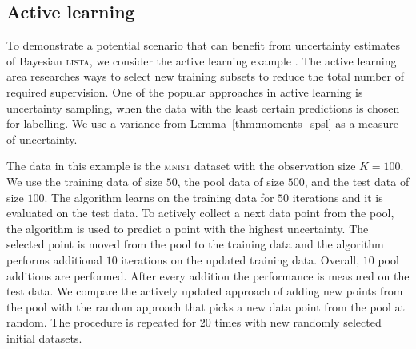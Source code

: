 \documentclass{article}
\begin{document}
\subsection{Active learning}
To demonstrate a potential scenario that can benefit from uncertainty estimates of Bayesian \textsc{lista}, we consider the active learning example \cite{settles.tr09}. The active learning area researches ways to select new training subsets to reduce the total number of required supervision. One of the popular approaches in active learning is uncertainty sampling, when the data with the least certain predictions is chosen for labelling. We use a variance from Lemma~\ref{thm:moments_spsl} as a measure of uncertainty.

The data in this example is the \textsc{mnist} dataset with the observation size $K=100$. We use the training data of size $50$, the pool data of size $500$,  and the test data of size $100$. The algorithm learns on the training data for $50$ iterations and it is evaluated on the test data. To actively collect a next data point from the pool, the algorithm is used to predict a point with the highest uncertainty. The selected point is moved from the pool to the training data and the algorithm performs additional $10$ iterations on the updated training data. Overall, $10$ pool additions are performed. After every addition the performance is measured on the test data. We compare the actively updated approach of adding new points from the pool with the random approach that picks a new data point from the pool at random. The procedure is repeated for $20$ times with new randomly selected initial datasets.
\end{document}
